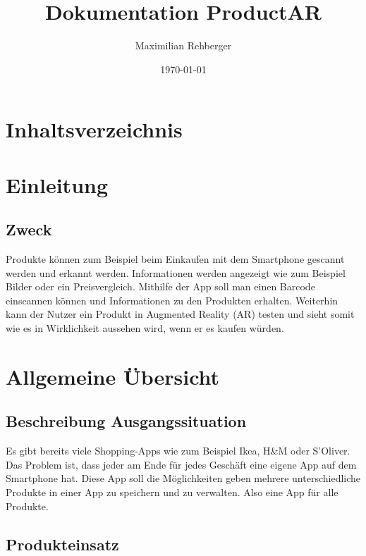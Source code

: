 \documentclass{scrartcl}
\title{Dokumentation ProductAR}
\author{Maximilian Rehberger}
\date{\today}
\begin{document}
\maketitle

\newpage


\renewcommand*\contentsname{}
\section{Inhaltsverzeichnis}
\tableofcontents{}


\newpage

\section{Einleitung}

\subsection{Zweck}

Produkte können zum Beispiel beim Einkaufen mit dem Smartphone gescannt werden und erkannt werden. Informationen werden angezeigt wie zum Beispiel Bilder oder ein Preisvergleich. Mithilfe der App soll man einen Barcode einscannen können und Informationen zu den Produkten erhalten. Weiterhin kann der Nutzer ein Produkt in Augmented Reality (AR) testen und sieht somit wie es in Wirklichkeit aussehen wird, wenn er es kaufen würden.

\newpage

\section{Allgemeine Übersicht}

\subsection{Beschreibung Ausgangssituation}

Es gibt bereits viele Shopping-Apps wie zum Beispiel Ikea, H\&M oder S'Oliver. Das Problem ist, dass jeder am Ende für jedes Geschäft eine eigene App auf dem Smartphone hat. Diese App soll die Möglichkeiten geben mehrere unterschiedliche Produkte in einer App zu speichern und zu verwalten. Also eine App für alle Produkte.

\subsection{Produkteinsatz}
\end{document}
